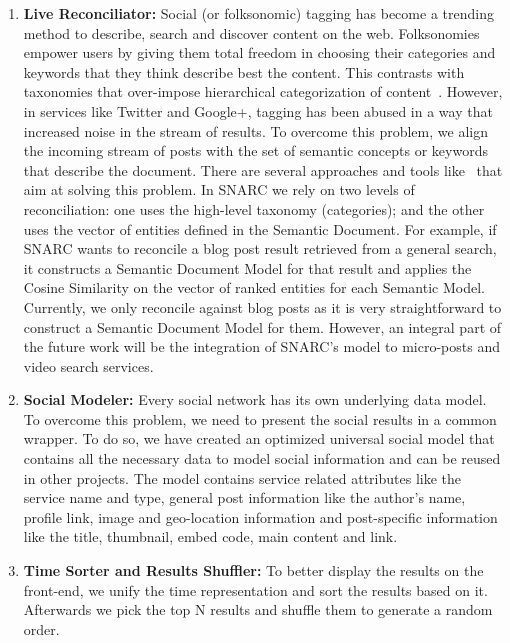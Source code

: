 \documentclass[oribibl]{llncs}
\begin{document}
\begin{enumerate}
\item {\bf Live Reconciliator:} Social (or folksonomic) tagging has become a trending method to describe, search and discover content on the web. Folksonomies empower users by giving them total freedom in choosing their categories and keywords that they think describe best the content. This contrasts with taxonomies that over-impose hierarchical categorization of content~\cite{Zanardi2008}. However, in services like Twitter and Google+, tagging has been abused in a way that increased noise in the stream of results. To overcome this problem, we align the incoming stream of posts with the set of semantic concepts or keywords that describe the document. There are several approaches and tools like~\cite{Cantador2011,Diaz-Aviles2012,Preotiuc-Pietro2012,Zanardi2008} that aim at solving this problem. In SNARC we rely on two levels of reconciliation: one uses the high-level taxonomy (categories); and the other uses the vector of entities defined in the Semantic Document. For example, if SNARC wants to reconcile a blog post result retrieved from a general search, it constructs a Semantic Document Model for that result and applies the Cosine Similarity on the vector of ranked entities for each Semantic Model. Currently, we only reconcile against blog posts as it is very straightforward to construct a Semantic Document Model for them. However, an integral part of the future work will be the integration of SNARC's model to micro-posts and video search services.

\item {\bf Social Modeler:} Every social network has its own underlying data model. To overcome this problem, we need to present the social results in a common wrapper. To do so, we have created an optimized universal social model that contains all the necessary data to model social information and can be reused in other projects. The model contains service related attributes like the service name and type, general post information like the author's name, profile link, image and geo-location information and post-specific information like the title, thumbnail, embed code, main content and link.
\item {\bf Time Sorter and Results Shuffler:} To better display the results on the front-end, we unify the time representation and sort the results based on it. Afterwards we pick the top N results and shuffle them to generate a random order.
\end{enumerate}
\end{document}
